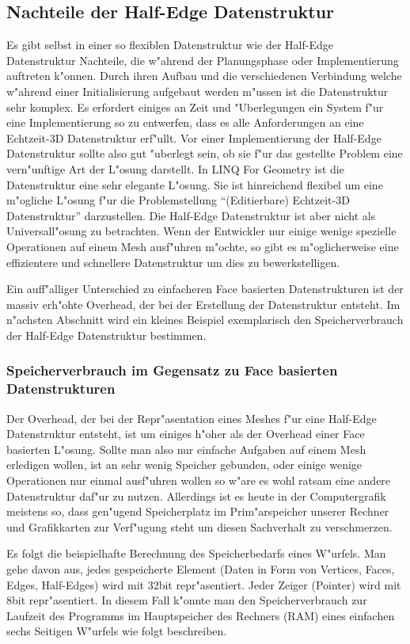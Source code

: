 \documentclass[pagesize, paper=a4, fontsize=12pt,titlepage=true, headings=small, headnosepline, abstractoff, liststotoc, nochapterprefix, plainheadsepline]{scrreprt}
\newcommand{\LFGS}{LINQ For Geometry }
\newcommand{\HES}{Half-Edge Datenstruktur }
\begin{document}
		\subsection {Nachteile der \HES}
Es gibt selbst in einer so flexiblen Datenstruktur wie der \HES Nachteile, die w"ahrend der Planungsphase oder Implementierung auftreten k"onnen.
			Durch ihren Aufbau und die verschiedenen Verbindung welche w"ahrend einer Initialisierung aufgebaut werden m"ussen ist die Datenstruktur sehr komplex. Es erfordert einiges an Zeit und "Uberlegungen ein System f"ur eine Implementierung so zu entwerfen, dass es alle Anforderungen an eine Echtzeit-3D Datenstruktur erf"ullt. Vor einer Implementierung der \HES sollte also gut "uberlegt sein, ob sie f"ur das gestellte Problem eine vern"unftige Art der L"osung darstellt. In \LFGS ist die Datenstruktur eine sehr elegante L"osung. Sie ist hinreichend flexibel um eine m"ogliche L"osung f"ur die Problemstellung "`(Editierbare) Echtzeit-3D Datenstruktur"' darzustellen. Die \HES ist aber nicht als Universall"osung zu betrachten. Wenn der Entwickler nur einige wenige spezielle Operationen auf einem Mesh ausf"uhren m"ochte, so gibt es m"oglicherweise eine effizientere und schnellere Datenstruktur um dies zu bewerkstelligen.

Ein auff"alliger Unterschied zu einfacheren Face basierten Datenstrukturen ist der massiv erh"ohte Overhead, der bei der Erstellung der Datenstruktur entsteht. Im n"achsten Abschnitt wird ein kleines Beispiel exemplarisch den Speicherverbrauch der \HES bestimmen.

\subsubsection {Speicherverbrauch im Gegensatz zu Face basierten Datenstrukturen}
			Der Overhead, der bei der Repr"asentation eines Meshes f"ur eine \HES entsteht, ist um einiges h"oher als der Overhead einer Face basierten L"osung. Sollte man also nur einfache Aufgaben auf einem Mesh erledigen wollen, ist an sehr wenig Speicher gebunden, oder einige wenige Operationen nur einmal ausf"uhren wollen so w"are es wohl ratsam eine andere Datenstruktur daf"ur zu nutzen. Allerdings ist es heute in der Computergrafik meistens so, dass gen"ugend Speicherplatz im Prim"arspeicher unserer Rechner und Grafikkarten zur Verf"ugung steht um diesen Sachverhalt zu verschmerzen.
\newline

Es folgt die beispielhafte Berechnung des Speicherbedarfs eines W"urfels.
Man gehe davon aus, jedes gespeicherte Element (Daten in Form von Vertices, Faces, Edges, Half-Edges) wird mit 32bit repr"asentiert. Jeder Zeiger (Pointer) wird mit 8bit repr"asentiert. In diesem Fall k"onnte man den Speicherverbrauch zur Laufzeit des Programms im Hauptspeicher des Rechners (RAM) eines einfachen sechs Seitigen W"urfels wie folgt beschreiben.
\end{document}
